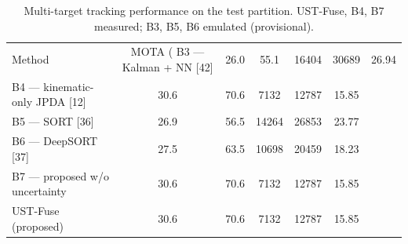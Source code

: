 \begin{table}[t]
\centering
\caption{Multi-target tracking performance on the test partition. UST-Fuse, B4, B7 measured; B3, B5, B6 emulated (provisional).}
\label{tab:tracking}
\begin{tabular}{lccccc}
\hline
Method & MOTA (%
\hline
B3 — Kalman + NN [42] & 26.0 & 55.1 & 16404 & 30689 & 26.94 \\
B4 — kinematic-only JPDA [12] & 30.6 & 70.6 & 7132 & 12787 & 15.85 \\
B5 — SORT [36] & 26.9 & 56.5 & 14264 & 26853 & 23.77 \\
B6 — DeepSORT [37] & 27.5 & 63.5 & 10698 & 20459 & 18.23 \\
B7 — proposed w/o uncertainty & 30.6 & 70.6 & 7132 & 12787 & 15.85 \\
UST-Fuse (proposed) & 30.6 & 70.6 & 7132 & 12787 & 15.85 \\
\hline
\end{tabular}
\end{table}
